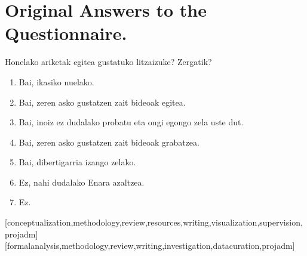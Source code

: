 \documentclass[english]{textolivre}
\begin{document}
\section{Original Answers to the Questionnaire.}\label{annex-03}

Honelako ariketak egitea gustatuko litzaizuke? Zergatik?
\begin{enumerate}
  \item Bai, ikasiko nuelako.
  \item Bai, zeren asko gustatzen zait bideoak egitea.
  \item Bai, inoiz ez dudalako probatu eta ongi egongo zela uste dut.
  \item Bai, zeren asko gustatzen zait bideoak grabatzea.
  \item Bai, dibertigarria izango zelako.
  \item Ez, nahi dudalako Enara azaltzea.
  \item Ez.
\end{enumerate}


\begin{contributors}
[conceptualization,methodology,review,resources,writing,visualization,supervision,projadm]
[formalanalysis,methodology,review,writing,investigation,datacuration,projadm]
\end{contributors}
\end{document}
